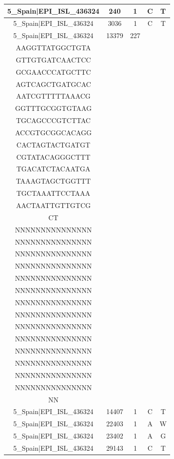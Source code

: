 \documentclass[a4paper,10pt]{article}
\begin{document}
\begin{longtable}{@{}ccccc@{}}
5\_Spain|EPI\_ISL\_436324 & 240 & 1 & C & T \\* \midrule
5\_Spain|EPI\_ISL\_436324 & 3036 & 1 & C & T \\* \midrule
5\_Spain|EPI\_ISL\_436324 & 13379 & 227 & \begin{tabular}[c]{@{}c@{}}TCTGCGGTATGTGGA\\ AAGGTTATGGCTGTA\\ GTTGTGATCAACTCC\\ GCGAACCCATGCTTC\\ AGTCAGCTGATGCAC\\ AATCGTTTTTAAACG\\ GGTTTGCGGTGTAAG\\ TGCAGCCCGTCTTAC\\ ACCGTGCGGCACAGG\\ CACTAGTACTGATGT\\ CGTATACAGGGCTTT\\ TGACATCTACAATGA\\ TAAAGTAGCTGGTTT\\ TGCTAAATTCCTAAA\\ AACTAATTGTTGTCG\\ CT\end{tabular} & \begin{tabular}[c]{@{}c@{}}NNNNNNNNNNNNNNN\\ NNNNNNNNNNNNNNN\\ NNNNNNNNNNNNNNN\\ NNNNNNNNNNNNNNN\\ NNNNNNNNNNNNNNN\\ NNNNNNNNNNNNNNN\\ NNNNNNNNNNNNNNN\\ NNNNNNNNNNNNNNN\\ NNNNNNNNNNNNNNN\\ NNNNNNNNNNNNNNN\\ NNNNNNNNNNNNNNN\\ NNNNNNNNNNNNNNN\\ NNNNNNNNNNNNNNN\\ NNNNNNNNNNNNNNN\\ NNNNNNNNNNNNNNN\\ NN\end{tabular} \\* \midrule
5\_Spain|EPI\_ISL\_436324 & 14407 & 1 & C & T \\* \midrule
5\_Spain|EPI\_ISL\_436324 & 22403 & 1 & A & W \\* \midrule
5\_Spain|EPI\_ISL\_436324 & 23402 & 1 & A & G \\* \midrule
5\_Spain|EPI\_ISL\_436324 & 29143 & 1 & C & T \\* \midrule

\end{longtable}
\end{document}
